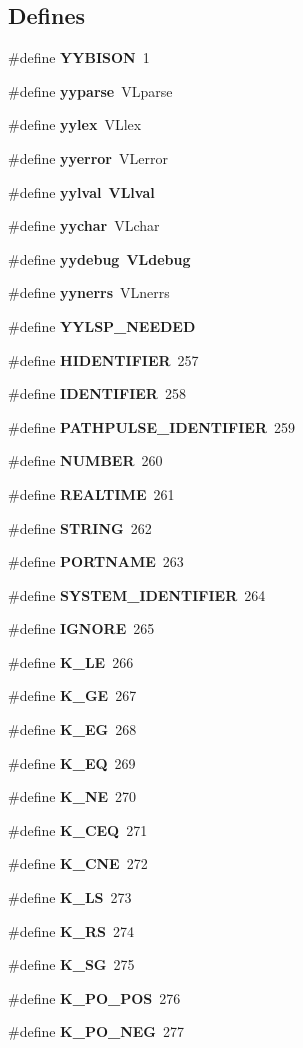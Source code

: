 \subsection*{Defines}
\begin{CompactItemize}
\item 
\#define {\bf YYBISON}\ 1
\item 
\#define {\bf yyparse}\ VLparse
\item 
\#define {\bf yylex}\ VLlex
\item 
\#define {\bf yyerror}\ VLerror
\item 
\#define {\bf yylval}\ {\bf VLlval}
\item 
\#define {\bf yychar}\ VLchar
\item 
\#define {\bf yydebug}\ {\bf VLdebug}
\item 
\#define {\bf yynerrs}\ VLnerrs
\item 
\#define {\bf YYLSP\_\-NEEDED}
\item 
\#define {\bf HIDENTIFIER}\ 257
\item 
\#define {\bf IDENTIFIER}\ 258
\item 
\#define {\bf PATHPULSE\_\-IDENTIFIER}\ 259
\item 
\#define {\bf NUMBER}\ 260
\item 
\#define {\bf REALTIME}\ 261
\item 
\#define {\bf STRING}\ 262
\item 
\#define {\bf PORTNAME}\ 263
\item 
\#define {\bf SYSTEM\_\-IDENTIFIER}\ 264
\item 
\#define {\bf IGNORE}\ 265
\item 
\#define {\bf K\_\-LE}\ 266
\item 
\#define {\bf K\_\-GE}\ 267
\item 
\#define {\bf K\_\-EG}\ 268
\item 
\#define {\bf K\_\-EQ}\ 269
\item 
\#define {\bf K\_\-NE}\ 270
\item 
\#define {\bf K\_\-CEQ}\ 271
\item 
\#define {\bf K\_\-CNE}\ 272
\item 
\#define {\bf K\_\-LS}\ 273
\item 
\#define {\bf K\_\-RS}\ 274
\item 
\#define {\bf K\_\-SG}\ 275
\item 
\#define {\bf K\_\-PO\_\-POS}\ 276
\item 
\#define {\bf K\_\-PO\_\-NEG}\ 277
\item 

\end{CompactItemize}
